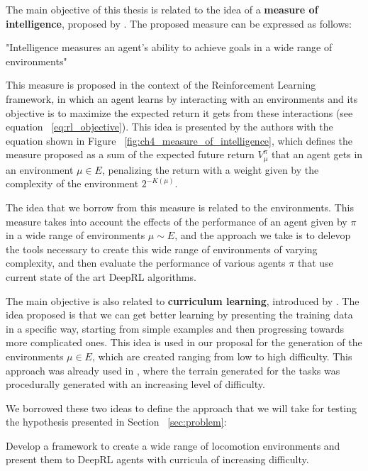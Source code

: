 The main objective of this thesis is related to the idea of a \textbf{measure of intelligence},
proposed by \cite{UniversalIntelligence}. The proposed measure can be expressed as follows:

\begin{centerItalic}
    "Intelligence measures an agent's ability to achieve goals in a 
     wide range of environments"
\end{centerItalic}

This measure is proposed in the context of the Reinforcement Learning framework, in
which an agent learns by interacting with an environments and its objective is to maximize
the expected return it gets from these interactions (see equation ~\ref{eq:rl_objective}).
This idea is presented by the authors with the equation shown in Figure ~\ref{fig:ch4_measure_of_intelligence}, 
which defines the measure proposed as a sum of the expected future return $V^{\pi}_{\mu}$ 
that an agent gets in an environment $\mu \in E$, penalizing the return with a weight 
given by the complexity of the environment $2^{-K(\mu)}$.

\figMeasureIntelligence

The idea that we borrow from this measure is related to the environments. This measure
takes into account the effects of the performance of an agent given by $\pi$ in a wide range of
environments $\mu \sim E$, and the approach we take is to delevop the tools necessary
to create this wide range of environments of varying complexity, and then evaluate the 
performance of various agents $\pi$ that use current state of the art DeepRL algorithms.

The main objective is also related to  \textbf{curriculum learning}, introduced
by \cite{CurriculumLearningBengio}. The idea proposed is that we can get better
learning by presenting the training data in a specific way, starting from simple
examples and then progressing towards more complicated ones. This idea is used
in our proposal for the generation of the environments $\mu \in E$, which are
created ranging from low to high difficulty. This approach was already used in 
\cite{DeepmindEmergenceLocomotion}, where the terrain generated for the tasks was 
procedurally generated with an increasing level of difficulty.

We borrowed these two ideas to define the approach that we will take for testing
the hypothesis presented in Section ~\ref{sec:problem}:

\begin{centerItalic}
    Develop a framework to create a wide range of locomotion environments and present 
    them to DeepRL agents with curricula of increasing difficulty.
\end{centerItalic}

